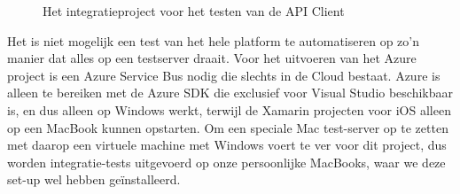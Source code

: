 \begin{figure}[ht]
\centering
{}


\caption{Het integratieproject voor het testen van de API Client}
\label{fig:integratie-project}
\end{figure}

Het is niet mogelijk een test van het hele platform te automatiseren op zo'n manier dat alles op een testserver draait. Voor het uitvoeren van het Azure project is een Azure Service Bus nodig die slechts in de Cloud bestaat. Azure is alleen te bereiken met de Azure SDK die exclusief voor Visual Studio beschikbaar is, en dus alleen op Windows werkt, terwijl de Xamarin projecten voor iOS alleen op een MacBook kunnen opstarten. Om een speciale Mac test-server op te zetten met daarop een virtuele machine met Windows voert te ver voor dit project, dus worden integratie-tests uitgevoerd op onze persoonlijke MacBooks, waar we deze set-up wel hebben geïnstalleerd.

